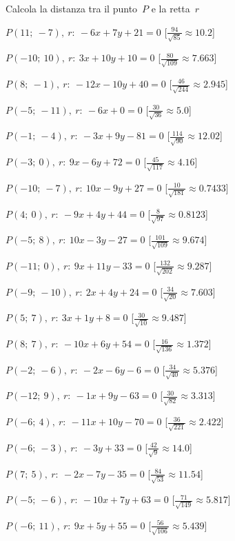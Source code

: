 \begin{esercizio}\label{ese:}
 Calcola la distanza tra il punto~$P$ e la retta~$r$
 \begin{enumeratea}
  \item  $P(11;~-7),~r:~-6 x + 7 y + 21 = 0$ \hfill 
   [$\frac{94}{\sqrt{85}}\approx  10.2$]
  \item  $P(-10;~10),~r:~3 x + 10 y + 10 = 0$ \hfill 
   [$\frac{80}{\sqrt{109}}\approx 7.663$]
  \item  $P(8;~-1),~r:~-12 x - 10 y + 40 = 0$ \hfill 
   [$\frac{46}{\sqrt{244}}\approx 2.945$]
  \item  $P(-5;~-11),~r:~-6 x + 0 = 0$ \hfill 
   [$\frac{30}{\sqrt{36}}\approx   5.0$]
  \item  $P(-1;~-4),~r:~-3 x + 9 y - 81 = 0$ \hfill 
   [$\frac{114}{\sqrt{90}}\approx 12.02$]
  \item  $P(-3;~0),~r:~9 x - 6 y + 72 = 0$ \hfill 
   [$\frac{45}{\sqrt{117}}\approx  4.16$]
  \item  $P(-10;~-7),~r:~10 x - 9 y + 27 = 0$ \hfill 
   [$\frac{10}{\sqrt{181}}\approx0.7433$]
  \item  $P(4;~0),~r:~-9 x + 4 y + 44 = 0$ \hfill 
   [$\frac{8}{\sqrt{97}}\approx0.8123$]
  \item  $P(-5;~8),~r:~10 x - 3 y - 27 = 0$ \hfill 
   [$\frac{101}{\sqrt{109}}\approx 9.674$]
  \item  $P(-11;~0),~r:~9 x + 11 y - 33 = 0$ \hfill 
   [$\frac{132}{\sqrt{202}}\approx 9.287$]
  \item  $P(-9;~-10),~r:~2 x + 4 y + 24 = 0$ \hfill 
   [$\frac{34}{\sqrt{20}}\approx 7.603$]
  \item  $P(5;~7),~r:~3 x + 1 y + 8 = 0$ \hfill 
   [$\frac{30}{\sqrt{10}}\approx 9.487$]
  \item  $P(8;~7),~r:~-10 x + 6 y + 54 = 0$ \hfill 
   [$\frac{16}{\sqrt{136}}\approx 1.372$]
  \item  $P(-2;~-6),~r:~-2 x - 6 y - 6 = 0$ \hfill 
   [$\frac{34}{\sqrt{40}}\approx 5.376$]
  \item  $P(-12;~9),~r:~-1 x + 9 y - 63 = 0$ \hfill 
   [$\frac{30}{\sqrt{82}}\approx 3.313$]
  \item  $P(-6;~4),~r:~-11 x + 10 y - 70 = 0$ \hfill 
   [$\frac{36}{\sqrt{221}}\approx 2.422$]
  \item  $P(-6;~-3),~r:~-3 y + 33 = 0$ \hfill 
   [$\frac{42}{\sqrt{9}}\approx  14.0$]
  \item  $P(7;~5),~r:~-2 x - 7 y - 35 = 0$ \hfill 
   [$\frac{84}{\sqrt{53}}\approx 11.54$]
  \item  $P(-5;~-6),~r:~-10 x + 7 y + 63 = 0$ \hfill 
   [$\frac{71}{\sqrt{149}}\approx 5.817$]
  \item  $P(-6;~11),~r:~9 x + 5 y + 55 = 0$ \hfill 
   [$\frac{56}{\sqrt{106}}\approx 5.439$]
 \end{enumeratea}
\end{esercizio}


